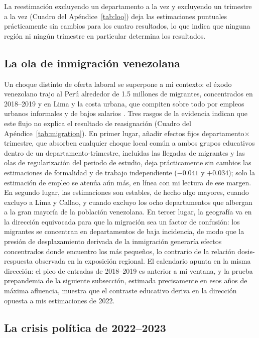 La reestimación excluyendo un departamento a la vez y excluyendo un trimestre a la vez (Cuadro del Apéndice~\ref{tab:loo}) deja las estimaciones puntuales prácticamente sin cambios para los cuatro resultados, lo que indica que ninguna región ni ningún trimestre en particular determina los resultados.

\subsection{La ola de inmigración venezolana}

Un choque distinto de oferta laboral se superpone a mi contexto: el éxodo venezolano trajo al Perú alrededor de 1.5 millones de migrantes, concentrados en 2018--2019 y en Lima y la costa urbana, que compiten sobre todo por empleos urbanos informales y de bajos salarios \citep{asencios_castellares_2020}. Tres rasgos de la evidencia indican que este flujo no explica el resultado de reasignación (Cuadro del Apéndice~\ref{tab:migration}). En primer lugar, añadir efectos fijos departamento$\times$trimestre, que absorben cualquier choque local común a ambos grupos educativos dentro de un departamento-trimestre, incluidas las llegadas de migrantes y las olas de regularización del periodo de estudio, deja prácticamente sin cambios las estimaciones de formalidad y de trabajo independiente ($-0.041$ y $+0.034$); solo la estimación de empleo se atenúa aún más, en línea con mi lectura de ese margen. En segundo lugar, las estimaciones son estables, de hecho algo mayores, cuando excluyo a Lima y Callao, y cuando excluyo los ocho departamentos que albergan a la gran mayoría de la población venezolana. En tercer lugar, la geografía va en la dirección equivocada para que la migración sea un factor de confusión: los migrantes se concentran en departamentos de baja incidencia, de modo que la presión de desplazamiento derivada de la inmigración generaría efectos concentrados donde encuentro los más pequeños, lo contrario de la relación dosis-respuesta observada en la exposición regional. El calendario apunta en la misma dirección: el pico de entradas de 2018--2019 es anterior a mi ventana, y la prueba prepandemia de la siguiente subsección, estimada precisamente en esos años de máxima afluencia, muestra que el contraste educativo deriva en la dirección opuesta a mis estimaciones de 2022.

\subsection{La crisis política de 2022--2023}

